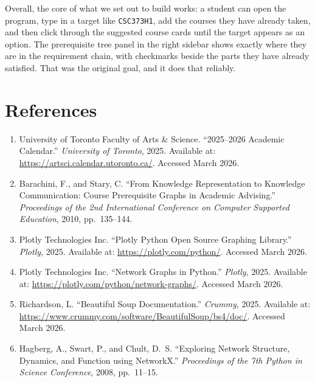 \documentclass[11pt]{article}
\begin{document}
Overall, the core of what we set out to build works: a student can open the program, type in
a target like \verb|CSC373H1|, add the courses they have already taken, and then click
through the suggested course cards until the target appears as an option. The prerequisite
tree panel in the right sidebar shows exactly where they are in the requirement chain, with
checkmarks beside the parts they have already satisfied. That was the original goal, and it
does that reliably.

\section*{References}

\begin{enumerate}

    \item[{[1]}] University of Toronto Faculty of Arts \& Science. ``2025--2026 Academic
    Calendar.'' \textit{University of Toronto}, 2025.
    Available at: \url{https://artsci.calendar.utoronto.ca/}. Accessed March 2026.

    \item[{[2]}] Barachini, F., and Stary, C. ``From Knowledge Representation to Knowledge
    Communication: Course Prerequisite Graphs in Academic Advising.'' \textit{Proceedings of
    the 2nd International Conference on Computer Supported Education}, 2010, pp.\ 135--144.

    \item[{[3]}] Plotly Technologies Inc. ``Plotly Python Open Source Graphing Library.''
    \textit{Plotly}, 2025. Available at: \url{https://plotly.com/python/}. Accessed March
    2026.

    \item[{[4]}] Plotly Technologies Inc. ``Network Graphs in Python.'' \textit{Plotly},
    2025. Available at: \url{https://plotly.com/python/network-graphs/}. Accessed March 2026.

    \item[{[5]}] Richardson, L. ``Beautiful Soup Documentation.'' \textit{Crummy}, 2025.
    Available at: \url{https://www.crummy.com/software/BeautifulSoup/bs4/doc/}. Accessed
    March 2026.

    \item[{[6]}] Hagberg, A., Swart, P., and Chult, D.\ S. ``Exploring Network Structure,
    Dynamics, and Function using NetworkX.'' \textit{Proceedings of the 7th Python in Science
    Conference}, 2008, pp.\ 11--15.

\end{enumerate}
\end{document}
